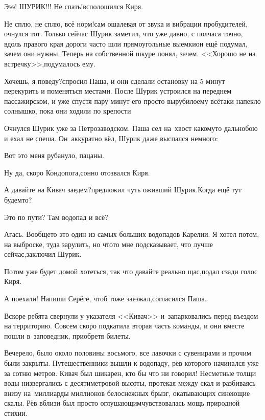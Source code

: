 \diagdash Э\sdash э\sdash э! ШУРИК!!! Не спать!\mdash всполошился Киря.

\diagdash Не сплю, не сплю, всё норм!\mdash сам ошалевая от звука и вибрации пробудителей, очнулся тот. Только сейчас Шурик заметил, что уже давно, с полчаса точно, вдоль правого края дороги часто шли прямоугольные выемки\mdash он ещё подумал, зачем они нужны. Теперь на собственной шкуре понял, зачем. <<Хорошо не на встречку>>,\mdash подумалось ему.

\diagdash Хочешь, я поведу?\mdash спросил Паша, и они сделали остановку на 5 минут перекурить и поменяться местами. После Шурик устроился на переднем пассажирском, и уже спустя пару минут его просто вырубило\mdash ему всё\sdash таки напекло солнышко, пока они ходили по крепости\myldots{} 



\myldots{}Очнулся Шурик уже за Петрозаводском. Паша сел на~хвост какому\sdash то дальнобою и ехал не спеша. Он~аккуратно вёл, Шурик даже выспался немного:


\diagdash Вот это меня рубануло, пацаны.

\diagdash Ну да, скоро Кондопога,\mdash сонно отозвался Киря.

\diagdash А давайте на Кивач заедем?\mdash предложил чуть оживший Шурик.\mdash Когда ещё тут будем\sdash то?

\diagdash Это по пути? Там водопад и всё?

\diagdash Агась. Вообще\sdash то это один из самых больших водопадов Карелии. Я хотел потом, на выброске, туда зарулить, но что\sdash то мне подсказывает, что лучше сейчас,\mdash заключил Шурик.

\diagdash Потом уже будет домой хотеться, так что давайте реально щас,\mdash подал сзади голос Киря.

\diagdash А поехали! Напиши Серёге, чтоб тоже заезжал,\mdash согласился Паша.

\newpage

Вскоре ребята свернули у указателя <<Кивач>> и~запарковались перед въездом на территорию. Совсем скоро подкатила вторая часть команды, и они вместе пошли в~заповедник, приобретя билеты.

Вечерело, было около половины восьмого, все лавочки с сувенирами и прочим были закрыты. Путешественники вышли к водопаду, рёв которого начинался уже за сотню метров. Кивач был шикарен, кто бы что ни говорил! Несметные толщи воды низвергались с десятиметровой высоты, протекая между скал и разбиваясь внизу на~миллиарды миллионов белоснежных брызг, окатывающих синеющие скалы. Рёв вблизи был просто оглушающим\mdash чувствовалась мощь природной стихии. 

